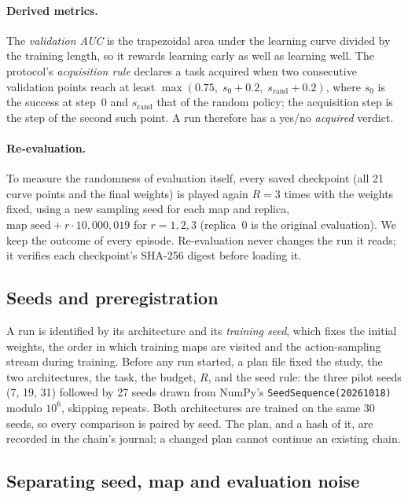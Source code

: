 \paragraph{Derived metrics.}
The \emph{validation AUC} is the trapezoidal area under the learning curve divided by the
training length, so it rewards learning early as well as learning well. The protocol's
\emph{acquisition rule} declares a task acquired when two consecutive validation points reach
at least $\max(0.75,\; s_0+0.2,\; s_{\text{rand}}+0.2)$, where $s_0$ is the success at step~0 and
$s_{\text{rand}}$ that of the random policy; the acquisition step is the step of the second such
point. A run therefore has a yes/no \emph{acquired} verdict.

\paragraph{Re-evaluation.}
To measure the randomness of evaluation itself, every saved checkpoint (all 21 curve points and
the final weights) is played again $R=3$ times with the weights fixed, using a new sampling seed
for each map and replica, $\text{map seed} + r\cdot 10{,}000{,}019$ for $r=1,2,3$ (replica~0 is
the original evaluation). We keep the outcome of every episode. Re-evaluation never changes the
run it reads; it verifies each checkpoint's SHA-256 digest before loading it.

\subsection{Seeds and preregistration}
\label{sec:seeds}

A run is identified by its architecture and its \emph{training seed}, which fixes the initial
weights, the order in which training maps are visited and the action-sampling stream during
training. Before any run started, a plan file fixed the study, the two architectures, the task,
the budget, $R$, and the seed rule: the three pilot seeds (7, 19, 31) followed by 27 seeds drawn
from NumPy's \texttt{SeedSequence(20261018)} modulo $10^6$, skipping repeats. Both architectures
are trained on the same 30 seeds, so every comparison is paired by seed. The plan, and a hash of
it, are recorded in the chain's journal; a changed plan cannot continue an existing chain.

\subsection{Separating seed, map and evaluation noise}
\label{sec:gtheory}

